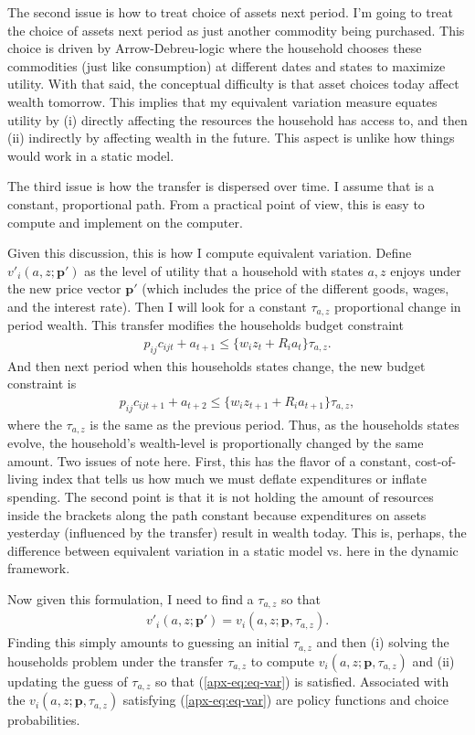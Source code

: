 \documentclass[12pt,pdftex]{article}
\begin{document}
\begin{onehalfspacing}
The second issue is how to treat choice of assets next period. I'm going to treat the choice of assets next period as just another commodity being purchased. This choice is driven by Arrow-Debreu-logic where the household chooses these commodities (just like consumption) at different dates and states to maximize utility. With that said, the conceptual difficulty is that asset choices today affect wealth tomorrow. This implies that my equivalent variation measure equates utility by (i) directly affecting the resources the household has access to, and then (ii) indirectly by affecting wealth in the future. This aspect is unlike how things would work in a static model.

The third issue is how the transfer is dispersed over time. I assume that is a constant, proportional path. From a practical point of view, this is easy to compute and implement on the computer.

Given this discussion, this is how I compute equivalent variation. Define $v'_i(a,z ; \mathbf{p'})$ as the level of utility that a household with states $a,z$ enjoys under the new price vector $\mathbf{p'}$ (which includes the price of the different goods, wages, and the interest rate). Then I will look for a constant $\tau_{a,z}$  proportional change in period wealth. This transfer modifies the households budget constraint
\begin{align}
p_{ij}c_{ijt} + a_{t+1} \leq \bigg\{ w_{i}z_{t} + R_i a_{t} \bigg\}\tau_{a,z}.
\end{align}
And then next period when this households states change, the new budget constraint is
\begin{align}
p_{ij}c_{ijt+1} + a_{t+2} \leq \bigg\{ w_{i}z_{t+1} + R_i a_{t+1} \bigg\}\tau_{a,z},
\end{align}
where the $\tau_{a,z}$ is the same as the previous period. Thus, as the households states evolve, the household's wealth-level is proportionally changed by the same amount. Two issues of note here. First, this has the flavor of a constant, cost-of-living index that tells us how much we must deflate expenditures or inflate spending. The second point is that it is not holding the amount of resources inside the brackets along the path constant because expenditures on assets yesterday (influenced by the transfer) result in wealth today. This is, perhaps, the difference between equivalent variation in a static model vs. here in the dynamic framework.

Now given this formulation, I need to find a $\tau_{a,z}$ so that
\begin{align}
v'_i(a,z ; \mathbf{p'}) = v_i(a,z ; \mathbf{p}, \tau_{a,z}). \label{apx-eq:eq-var}
\end{align}
Finding this simply amounts to guessing an initial $\tau_{a,z}$  and then (i) solving the households problem under the transfer $\tau_{a,z}$ to compute $v_i(a,z ; \mathbf{p}, \tau_{a,z})$ and (ii) updating the guess of $\tau_{a,z}$ so that (\ref{apx-eq:eq-var}) is satisfied. Associated with the $v_i(a,z ; \mathbf{p}, \tau_{a,z})$ satisfying (\ref{apx-eq:eq-var}) are policy functions and choice probabilities.


\end{onehalfspacing}
\end{document}
